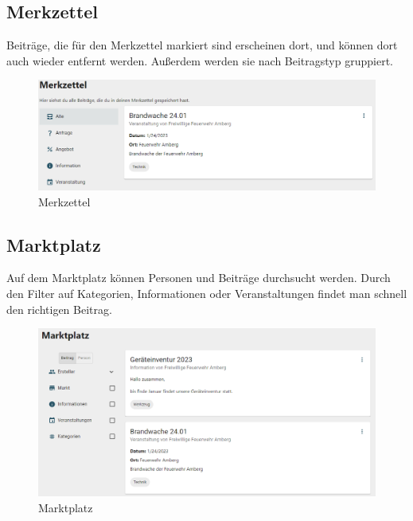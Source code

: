 \subsection{Merkzettel}
\label{sec:bookmark}

Beiträge, die für den Merkzettel markiert sind erscheinen dort, und können dort auch wieder entfernt werden.
Außerdem werden sie nach Beitragstyp gruppiert.

\begin{figure}[ht!]
  \begin{centering}
    \includegraphics[width=1\textwidth]{figures/implementation/merkzettel.png}
    \caption{Merkzettel}
    \label{fig:merkzettel}
  \end{centering}
\end{figure}

\clearpage
\subsection{Marktplatz}
\label{sec:marketplace}

Auf dem Marktplatz können Personen und Beiträge durchsucht werden.
Durch den Filter auf Kategorien, Informationen oder Veranstaltungen findet man schnell den richtigen Beitrag.

\begin{figure}[ht!]
  \begin{centering}
    \includegraphics[width=1\textwidth]{figures/implementation/marktplatz.png}
    \caption{Marktplatz}
    \label{fig:marktplatz}
  \end{centering}
\end{figure}


